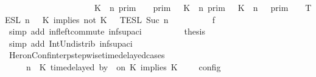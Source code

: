 \begin{isabellebody}
\ \ \ \ \ \ \ \ \ \ \ \ \ \ \ \ \ \ \ {\isacharequal}\ {\isacharparenleft}{\isasymlbrakk}\ K\ {\isasymnot}{\isasymUp}\ n\ {\isasymrbrakk}\isactrlsub p\isactrlsub r\isactrlsub i\isactrlsub m\ {\isasyminter}\ {\isasymlbrakk}{\isasymlbrakk}\ {\isasymGamma}\ {\isasymrbrakk}{\isasymrbrakk}\isactrlsub p\isactrlsub r\isactrlsub i\isactrlsub m\ {\isasymunion}\ {\isasymlbrakk}\ K\ {\isasymUp}\ n\ {\isasymrbrakk}\isactrlsub p\isactrlsub r\isactrlsub i\isactrlsub m\ {\isasyminter}\ {\isasymlbrakk}{\isasymlbrakk}\ {\isacharparenleft}K\ {\isasymnot}{\isasymUp}\ n{\isacharparenright}\ {\isacharhash}\ {\isasymGamma}\ {\isasymrbrakk}{\isasymrbrakk}\isactrlsub p\isactrlsub r\isactrlsub i\isactrlsub m{\isacharparenright}\ {\isasyminter}\ {\isacharparenleft}{\isasymlbrakk}{\isasymlbrakk}\ {\isasymPsi}\ {\isasymrbrakk}{\isasymrbrakk}\isactrlsub T\isactrlsub E\isactrlsub S\isactrlsub L\isactrlbsup {\isasymge}\ n\isactrlesup \ {\isasyminter}\ {\isasymlbrakk}{\isasymlbrakk}\ {\isacharparenleft}K\ implies\ not\ K\ {\isacharhash}\ {\isasymPhi}\ {\isasymrbrakk}{\isasymrbrakk}\isactrlsub T\isactrlsub E\isactrlsub S\isactrlsub L\isactrlbsup {\isasymge}\ Suc\ n\isactrlesup {\isacharparenright}{\isacartoucheclose}\isanewline
\ \ \ \ \ \ \ \ \isamarkupfalse%
\ f{}\ \isamarkupfalse%
\ {\isacharparenleft}simp\ add{\isacharcolon}\ inf{\isacharunderscore}left{\isacharunderscore}commute\ inf{\isacharunderscore}sup{\isacharunderscore}aci{\isacharparenleft}{}{\isacharparenright}{\isacharparenright}\isanewline
\ \ \ \ \ \ \isamarkupfalse%
\ \isamarkupfalse%
\ {\isacharquery}thesis\isanewline
\ \ \ \ \ \ \ \ \isamarkupfalse%
\ {\isacharparenleft}simp\ add{\isacharcolon}\ Int{\isacharunderscore}Un{\isacharunderscore}distrib{}\ inf{\isacharunderscore}sup{\isacharunderscore}aci{\isacharparenleft}{}{\isacharparenright}{\isacharparenright}\isanewline
\ \ \ \ \isamarkupfalse%
\isanewline
\ \ \isamarkupfalse%
%
\endisatagproof
{\isafoldproof}%
%
\isadelimproof
\isanewline
%
\endisadelimproof
\isanewline
{}\isamarkupfalse%
\ HeronConf{\isacharunderscore}interp{\isacharunderscore}stepwise{\isacharunderscore}timedelayed{\isacharunderscore}cases{\isacharcolon}\isanewline
\ \ \ {\isacartoucheopen}{\isasymlbrakk}\ {\isasymGamma}{\isacharcomma}\ n\ {\isasymturnstile}\ {\isacharparenleft}{\isacharparenleft}K\ time{\isacharminus}delayed\ by\ {\isasymdelta}{\isasymtau}\ on\ K\ implies\ K\ {\isacharhash}\ {\isasymPsi}{\isacharparenright}\ {\isasymtriangleright}\ {\isasymPhi}\ {\isasymrbrakk}\isactrlsub c\isactrlsub o\isactrlsub n\isactrlsub f\isactrlsub i\isactrlsub g\isanewline

\end{isabellebody}
